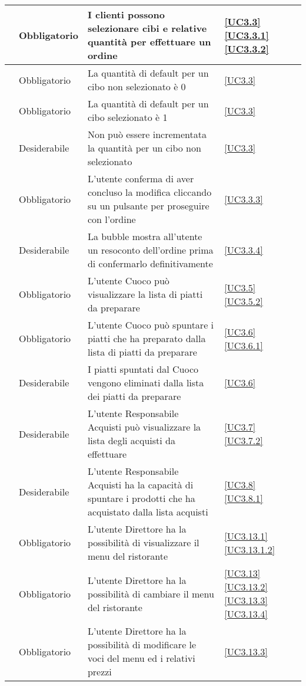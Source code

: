 \begin{longtable}{|P{1.5cm}|P{2.5cm}|P{6.5cm}|P{2.5cm}|}
	\hline \RequisitoObF\label{L24} & Obbligatorio & I clienti possono selezionare cibi e relative quantità per effettuare un ordine & \ref{UC3.3} \ref{UC3.3.1} \ref{UC3.3.2}\\
	\hline \RequisitoObF\label{L69} & Obbligatorio & La quantità di default per un cibo non selezionato è 0 & \ref{UC3.3} \\
	\hline \RequisitoObF\label{L77} & Obbligatorio & La quantità di default per un cibo selezionato è 1 & \ref{UC3.3} \\
	\hline \RequisitoDF\label{L70} & Desiderabile & Non può essere incrementata la quantità per un cibo non selezionato & \ref{UC3.3} \\
	\hline \RequisitoObF\label{L99} & Obbligatorio & L'utente conferma di aver concluso la modifica cliccando su un pulsante per proseguire con l'ordine & \ref{UC3.3.3} \\
	\hline \RequisitoDF\label{L100} & Desiderabile & La bubble mostra all'utente un resoconto dell'ordine prima di confermarlo definitivamente & \ref{UC3.3.4} \\
	\hline \RequisitoObF\label{L25} & Obbligatorio & L'utente Cuoco può visualizzare la lista di piatti da preparare & \ref{UC3.5} \ref{UC3.5.2} \\
	\hline \RequisitoObF\label{L26} & Obbligatorio & L'utente Cuoco può spuntare i piatti che ha preparato dalla lista di piatti da preparare  & \ref{UC3.6} \ref{UC3.6.1} \\
	\hline \RequisitoDF\label{L78} & Desiderabile & I piatti spuntati dal Cuoco vengono eliminati dalla lista dei piatti da preparare & \ref{UC3.6} \\
	\hline \RequisitoDF\label{L27} & Desiderabile & L'utente Responsabile Acquisti può visualizzare la lista degli acquisti da effettuare & \ref{UC3.7} \ref{UC3.7.2} \\
	\hline \RequisitoDF\label{L28} & Desiderabile & L'utente Responsabile Acquisti ha la capacità di spuntare i prodotti che ha acquistato dalla lista acquisti
	 & \ref{UC3.8} \ref{UC3.8.1} \\
	\hline \RequisitoObF\label{L104} & Obbligatorio & L'utente Direttore ha la possibilità di visualizzare il menu del ristorante & \ref{UC3.13.1} \ref{UC3.13.1.2} \\
	\hline \RequisitoObF\label{L105} & Obbligatorio & L'utente Direttore ha la possibilità di cambiare il menu del ristorante & \ref{UC3.13} \ref{UC3.13.2} \ref{UC3.13.3} \ref{UC3.13.4}\\
	\hline \RequisitoObF\label{L29} & Obbligatorio & L'utente Direttore ha la possibilità di modificare le voci del menu ed i relativi prezzi & \ref{UC3.13.3} \\

\end{longtable}
